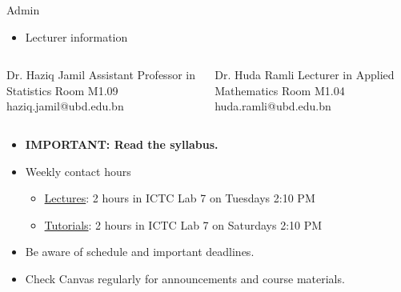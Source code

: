 \documentclass[,aspectratio=169]{beamer}
\newenvironment{Shaded}{\begin{snugshade}}{\end{snugshade}}
\newcommand{\NormalTok}[1]{#1}
\providecommand{\tightlist}{%
  \setlength{\itemsep}{0pt}\setlength{\parskip}{0pt}}
\begin{document}
\begin{frame}[fragile]{Admin}
\protect\hypertarget{admin-1}{}
\begin{itemize}
\tightlist
\item
  Lecturer information
\end{itemize}

\vspace{-1.5em}

\begin{columns}[T]
\begin{column}{0.45\textwidth}
\footnotesize

\begin{Shaded}
\begin{Highlighting}[]
\NormalTok{Dr. Haziq Jamil}
\NormalTok{Assistant Professor in Statistics}
\NormalTok{Room M1.09}
\NormalTok{haziq.jamil@ubd.edu.bn}
\end{Highlighting}
\end{Shaded}
\end{column}

\begin{column}{0.45\textwidth}
\footnotesize

\begin{Shaded}
\begin{Highlighting}[]
\NormalTok{Dr. Huda Ramli}
\NormalTok{Lecturer in Applied Mathematics}
\NormalTok{Room M1.04}
\NormalTok{huda.ramli@ubd.edu.bn}
\end{Highlighting}
\end{Shaded}
\end{column}
\end{columns}

\vspace{0.5em}

\begin{itemize}
\item
  \textcolor{solidpink}{\textbf{IMPORTANT: Read the syllabus.}}
\item
  Weekly contact hours

  \begin{itemize}
  \tightlist
  \item
    \underline{Lectures}: 2 hours in ICTC Lab 7 on Tuesdays 2:10 PM
  \item
    \underline{Tutorials}: 2 hours in ICTC Lab 7 on Saturdays 2:10 PM
  \end{itemize}
\item
  Be aware of schedule and important deadlines.
\item
  Check Canvas regularly for announcements and course materials.
\end{itemize}
\end{frame}
\end{document}
